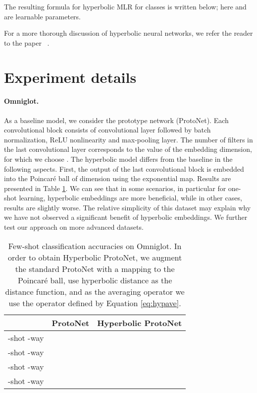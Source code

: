\documentclass[10pt,twocolumn,letterpaper]{article}
\begin{document}
The resulting formula for hyperbolic MLR for  classes is written below; here  and  are learnable parameters.



For a more thorough discussion of hyperbolic neural networks, we refer the reader to the paper ~\cite{ganea2018hyperbolic}. 

\section{Experiment details}{\label{app:details}}
\paragraph{Omniglot.}
As a baseline model, we consider the prototype network (ProtoNet). Each convolutional block consists of  convolutional layer followed by batch normalization, ReLU nonlinearity and  max-pooling layer. The number of filters in the last convolutional layer corresponds to the value of the embedding dimension, for which we choose . The hyperbolic model differs from the baseline in the following aspects. First, the output of the last convolutional block is embedded into the Poincar\'e ball of dimension  using the exponential map. 
Results are presented in Table \ref{tab:omni_proto}. We can see that in some scenarios, in particular for one-shot learning, hyperbolic embeddings are more beneficial, while in other cases, results are slightly worse. The relative simplicity of this dataset may explain why we have not observed a significant benefit of hyperbolic embeddings. We further test our approach on more advanced datasets.
\begin{table}[htb!]
\caption{Few-shot classification accuracies on Omniglot. In order to obtain Hyperbolic ProtoNet, we augment the standard ProtoNet with a mapping to the Poincar\'e ball, use hyperbolic distance as the distance function, and as the averaging operator we use the  operator defined by Equation \eqref{eq:hypave}.}
\label{tab:omni_proto}
\begin{center}
  \begin{tabular}{lcc}
\toprule
  {} & {ProtoNet} & {Hyperbolic ProtoNet} \\
    \midrule
    {-shot -way} &  &  \\
    {-shot -way} &  &  \\
    {-shot -way} &  &  \\
    {-shot -way} &  &  \\
    \bottomrule
  \end{tabular}
\end{center}
\vspace{-7mm}
\end{table}
\end{document}
